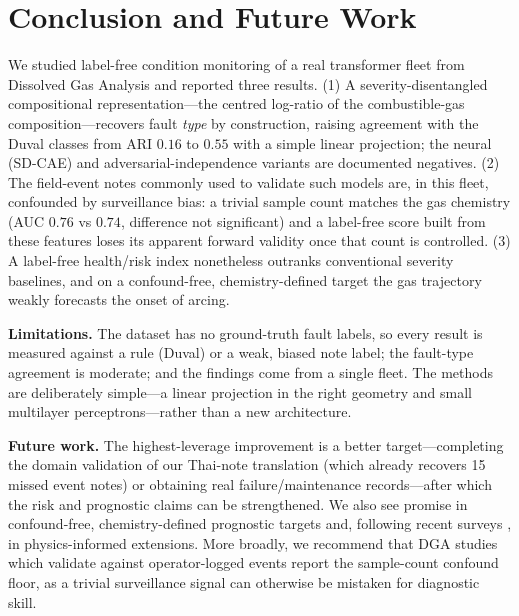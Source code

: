 \section{Conclusion and Future Work}

We studied label-free condition monitoring of a real transformer fleet from Dissolved Gas
Analysis and reported three results. (1) A severity-disentangled compositional
representation---the centred log-ratio of the combustible-gas composition---recovers fault
\emph{type} by construction, raising agreement with the Duval classes from ARI $0.16$ to $0.55$
with a simple linear projection; the neural (SD-CAE) and adversarial-independence variants are
documented negatives. (2) The field-event notes commonly used to validate such models are, in
this fleet, confounded by surveillance bias: a trivial sample count matches the gas chemistry
(AUC $0.76$ vs $0.74$, difference not significant) and a label-free score built from these
features loses its apparent forward validity once that count is controlled. (3) A label-free
health/risk index nonetheless outranks conventional severity baselines, and on a confound-free,
chemistry-defined target the gas trajectory weakly forecasts the onset of arcing.

\textbf{Limitations.} The dataset has no ground-truth fault labels, so every result is measured
against a rule (Duval) or a weak, biased note label; the fault-type agreement is moderate; and
the findings come from a single fleet. The methods are deliberately simple---a linear projection
in the right geometry and small multilayer perceptrons---rather than a new architecture.

\textbf{Future work.} The highest-leverage improvement is a better target---completing the
domain validation of our Thai-note translation (which already recovers 15 missed event notes)
or obtaining real failure/maintenance records---after which the risk and prognostic claims can
be strengthened. We also see promise in confound-free, chemistry-defined prognostic targets and,
following recent surveys \cite{ramarao2026review}, in physics-informed extensions. More broadly,
we recommend that DGA studies
which validate against operator-logged events report the sample-count confound floor, as a
trivial surveillance signal can otherwise be mistaken for diagnostic skill.
